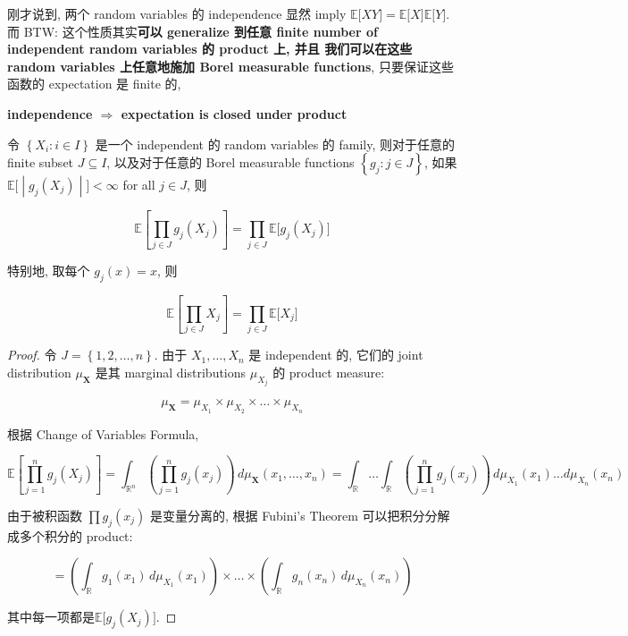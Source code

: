 \documentclass{qlnotes-export}
\begin{document}
刚才说到, 两个 random variables 的 independence 显然 imply \({\mathbb{E}}\lbrack XY\rbrack = {\mathbb{E}}\lbrack X\rbrack{\mathbb{E}}\lbrack Y\rbrack\). 而 BTW: 这个性质其实\textbf{可以 generalize 到任意 finite number of independent random variables 的 product 上, 并且 我们可以在这些 random variables 上任意地施加 Borel measurable functions}, 只要保证这些函数的 expectation 是 finite 的,

\begin{theorem}{\protect{}\label{kn-independence-implies-expectation-is-closed-under-product}{\textbf{independence
\(\Longrightarrow\) expectation is closed under product}}}

令 \(\left\{ {X_{i}:i \in I} \right\}\) 是一个 independent 的 random variables 的 family, 则对于任意的 finite subset \(J \subseteq I\), 以及对于任意的 Borel measurable functions \(\left\{ {g_{j}:j \in J} \right\}\), 如果 \(\left. {\mathbb{E}}\lbrack \middle| g_{j}(X_{j}) \middle| \rbrack < \infty \right.\) for all \(j \in J\), 则

\[{\mathbb{E}}\left\lbrack {\prod\limits_{j \in J}g_{j}(X_{j})} \right\rbrack = \prod\limits_{j \in J}{\mathbb{E}}\lbrack g_{j}(X_{j})\rbrack\]

特别地, 取每个 \(g_{j}(x) = x\), 则

\[{\mathbb{E}}\left\lbrack {\prod\limits_{j \in J}X_{j}} \right\rbrack = \prod\limits_{j \in J}{\mathbb{E}}\lbrack X_{j}\rbrack\]

\end{theorem}

\begin{proof}

令 \(J = \left\{ {1,2,\ldots,n} \right\}\). 由于 \(X_{1},\ldots,X_{n}\) 是 independent 的, 它们的 joint distribution \(\mu_{\mathbf{X}}\) 是其 marginal distributions \(\mu_{X_{j}}\) 的 product measure:

\[\mu_{\mathbf{X}} = \mu_{X_{1}} \times \mu_{X_{2}} \times \ldots \times \mu_{X_{n}}\]

根据 Change of Variables Formula,

\[{\mathbb{E}}\left\lbrack {\prod\limits_{j = 1}^{n}g_{j}(X_{j})} \right\rbrack = \int_{{\mathbb{R}}^{n}}\left( {\prod\limits_{j = 1}^{n}g_{j}(x_{j})} \right)\, d\mu_{\mathbf{X}}(x_{1},\ldots,x_{n}) = \int_{\mathbb{R}}\ldots\int_{\mathbb{R}}\left( {\prod\limits_{j = 1}^{n}g_{j}(x_{j})} \right)\, d\mu_{X_{1}}(x_{1})\ldots d\mu_{X_{n}}(x_{n})\]

由于被积函数 \(\prod g_{j}(x_{j})\) 是变量分离的, 根据 Fubini's Theorem 可以把积分分解成多个积分的 product:

\[= \left( {\int_{\mathbb{R}}g_{1}(x_{1})\, d\mu_{X_{1}}(x_{1})} \right) \times \ldots \times \left( {\int_{\mathbb{R}}g_{n}(x_{n})\, d\mu_{X_{n}}(x_{n})} \right)\]

其中每一项都是\({\mathbb{E}}\lbrack g_{j}(X_{j})\rbrack\).

\end{proof}
\end{document}
